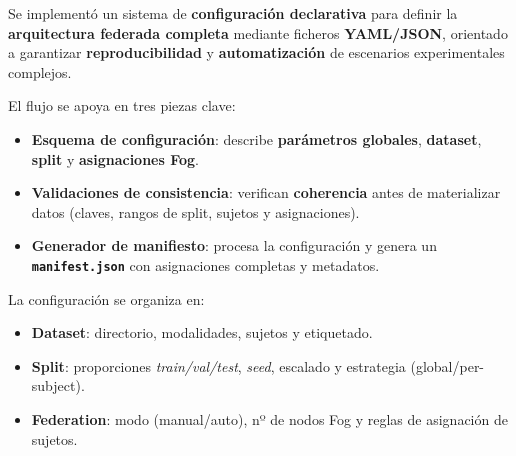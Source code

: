 \documentclass{report}
\begin{document}
Se implementó un sistema de \textbf{configuración declarativa} para definir la \textbf{arquitectura federada completa} mediante ficheros \textbf{YAML/JSON}, orientado a garantizar \textbf{reproducibilidad} y \textbf{automatización} de escenarios experimentales complejos.

El flujo se apoya en tres piezas clave:
\begin{itemize}
    \item \textbf{Esquema de configuración}: describe \textbf{parámetros globales}, \textbf{dataset}, \textbf{split} y \textbf{asignaciones Fog}.
    \item \textbf{Validaciones de consistencia}: verifican \textbf{coherencia} antes de materializar datos (claves, rangos de split, sujetos y asignaciones).
    \item \textbf{Generador de manifiesto}: procesa la configuración y genera un \textbf{\texttt{manifest.json}} con asignaciones completas y metadatos.
\end{itemize}

La configuración se organiza en:
\begin{itemize}
    \item \textbf{Dataset}: directorio, modalidades, sujetos y etiquetado.
    \item \textbf{Split}: proporciones \textit{train/val/test}, \textit{seed}, escalado y estrategia (global/per-subject).
    \item \textbf{Federation}: modo (manual/auto), nº de nodos Fog y reglas de asignación de sujetos.
\end{itemize}


\end{document}
